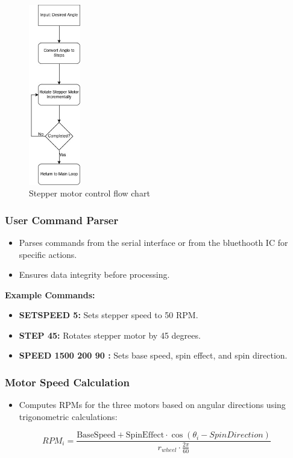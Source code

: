 \documentclass[12pt]{article}
\begin{document}
\begin{figure}[H]
    \centering
    \includegraphics[width=0.2\textwidth]{CH5 figureler/salih figureler/Stepper motor control flow chart.jpg}
    \caption{Stepper motor control flow chart}
    \label{fig:Stepper motor control flow chart}
\end{figure}

\subsubsection{User Command Parser}

\begin{itemize}
    \item Parses commands from the serial interface or from the bluethooth IC for specific actions.
    \item Ensures data integrity before processing.
\end{itemize}

\textbf{Example Commands:}

\begin{itemize}
    \item \textbf{SETSPEED 5:} Sets stepper speed to 50 RPM.
    \item \textbf{STEP 45:} Rotates stepper motor by 45 degrees.
    \item \textbf{SPEED 1500 200 90 :} Sets base speed, spin effect, and spin direction.
\end{itemize}

\subsubsection{Motor Speed Calculation}
\begin{itemize}
    \item Computes RPMs for the three motors based on angular directions using trigonometric calculations:
\end{itemize}
\[RPM_i = \frac{\mathrm{BaseSpeed + SpinEffect} \cdot \cos(\theta_i - SpinDirection)}{r_{wheel} \cdot \frac{2\pi}{60}}\]
\end{document}
